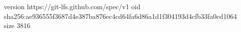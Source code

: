 version https://git-lfs.github.com/spec/v1
oid sha256:ae936555f3687d4e387ba876ec4cd64fa6d86a1d1f304193d4cfb33fa0cd1064
size 3816
